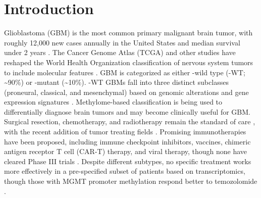 \section{Introduction}
Glioblastoma (GBM) is the most common primary malignant brain tumor, with roughly 12,000 new cases annually in the United States and median survival under 2 years \cite{delgado-lopezpd_corrales-garciaem:SurvivalGlioblastoma2016,ostromqt_barnholtz-sloanjs:CBTRUSStatistical2019}. The Cancer Genome Atlas (TCGA) \cite{brennancw_chinl:GBM2013,tcga_network:GBM2008} and other studies \cite{yanh_bignerdd:IDH1IDH22009} have reshaped the World Health Organization classification of nervous system tumors \cite{louisdn_ellisondw:2016World2016} to include molecular features \cite{bratdj_wellerm:CIMPACTNOWUpdate2018, louisdn_vondeimlinga:AnnouncingCIMPACTNOW2017}.
GBM is categorized as either -wild type (-WT; \textasciitilde90\%) or -mutant (\textasciitilde10\%). -WT GBMs fall into three distinct subclasses (proneural, classical, and mesenchymal) based on genomic alterations and gene expression signatures \cite{verhaakrgw_hayesdn:IntegratedGenomic2010,wangq_verhaakrgw:TumorEvolution2017}. Methylome-based classification is being used to differentially diagnose brain tumors \cite{karimis_zadehg:CentralNervous2019,nassirif_aldapekd:DNAMethylation2019} and may become clinically useful for GBM.
Surgical resection, chemotherapy, and radiotherapy remain the standard of care \cite{stuppr_mirimanoffro:RadiotherapyConcomitant2005,perryjr_trialinvestigators:ShortCourseRadiation2017}, with the recent addition of tumor treating fields \cite{stuppr_ramz:EffectTumorTreating2017}.
Promising immunotherapies have been proposed, including immune checkpoint inhibitors, vaccines, chimeric antigen receptor T cell (CAR-T) therapy, and viral therapy, though none have cleared Phase III trials \cite{limm_wellerm:CurrentState2018,mcgranahant_nagpals:CurrentState2019}.
Despite different subtypes, no specific treatment works more effectively in a pre-specified subset of patients based on transcriptomics, though those with MGMT promoter methylation respond better to temozolomide \cite{stuppr_mirimanoffro:RadiotherapyConcomitant2005}.

